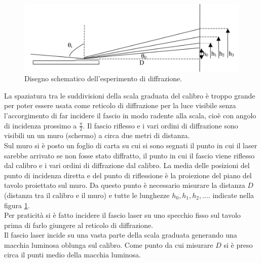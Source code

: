 \documentclass[10pt,a4paper]{article}
\begin{document}
\begin{figure}[!htb]
  \centering
  \includegraphics[scale=.5]{disegno1.png}
\caption{Disegno schematico dell'esperimento di diffrazione.}
\label{parteAfigura}

\end{figure}
La spaziatura tra le suddivisioni della scala graduata del calibro è troppo grande per poter essere usata come reticolo di diffrazione per la luce visibile senza l'accorgimento di far incidere il fascio in modo radente alla scala, cioè con angolo di incidenza prossimo a $\frac{\pi}{2}$. Il fascio riflesso e i vari ordini di diffrazione sono visibili un un muro (schermo) a circa due metri di distanza.\\
Sul muro si è posto un foglio di carta su cui si sono segnati il punto in cui il laser sarebbe arrivato se non fosse stato diffratto, il punto in cui il fascio viene riflesso dal calibro e i vari ordini di diffrazione dal calibro. La media delle posizioni del punto di incidenza diretta e del punto di riflessione è la proiezione del piano del tavolo proiettato sul muro. Da questo punto è necessario misurare la distanza $D$ (distanza tra il calibro e il muro) e tutte le lunghezze $h_0, h_1, h_2,...$. indicate nella figura \ref{parteAfigura}.\\
Per praticità si è fatto incidere il fascio laser su uno specchio fisso sul tavolo prima di farlo giungere al reticolo di diffrazione.\\ 
Il fascio laser incide su una vasta parte della scala graduata generando una macchia luminosa oblunga sul calibro. Come punto da cui misurare $D$ si è preso circa il punti medio della macchia luminosa.\\
\end{document}
